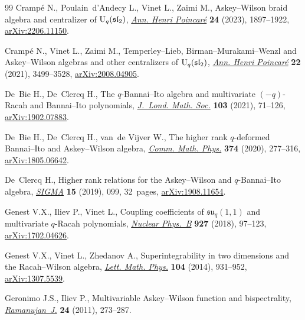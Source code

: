 \documentclass[pdftex]{sigma}
\numberwithin{equation}{section}
\theoremstyle{definition}
\begin{document}
\begin{thebibliography}{99}
Cramp\'e N., Poulain~d'Andecy L., Vinet L., Zaimi M., Askey--{W}ilson braid
 algebra and centralizer of {${\rm U}_q(\mathfrak{sl}_2)$}, \href{https://doi.org/10.1007/s00023-023-01275-4}{\textit{Ann. Henri
 Poincar\'e}} \textbf{24} (2023), 1897--1922, \href{https://arxiv.org/abs/2206.11150}{arXiv:2206.11150}.

Cramp\'e N., Vinet L., Zaimi M., Temperley--{L}ieb,
 {B}irman--{M}urakami--{W}enzl and {A}skey--{W}ilson algebras and other
 centralizers of {${\rm U}_q(\mathfrak{sl}_2)$}, \href{https://doi.org/10.1007/s00023-021-01064-x}{\textit{Ann. Henri Poincar\'e}}
 \textbf{22} (2021), 3499--3528, \href{https://arxiv.org/abs/2008.04905}{arXiv:2008.04905}.

De~Bie H., De~Clercq H., The {$q$}-{B}annai--{I}to algebra and multivariate
 {$(-q)$}-{R}acah and {B}annai--{I}to polynomials, \href{https://doi.org/10.1112/jlms.12367}{\textit{J.~Lond. Math.
 Soc.}} \textbf{103} (2021), 71--126, \href{https://arxiv.org/abs/1902.07883}{arXiv:1902.07883}.

De~Bie H., De~Clercq H., van~de Vijver W., The higher rank {$q$}-deformed
 {B}annai--{I}to and {A}skey--{W}ilson algebra, \href{https://doi.org/10.1007/s00220-019-03562-w}{\textit{Comm. Math. Phys.}}
 \textbf{374} (2020), 277--316, \href{https://arxiv.org/abs/1805.06642}{arXiv:1805.06642}.

De~Clercq H., Higher rank relations for the {A}skey--{W}ilson and
 {$q$}-{B}annai--{I}to algebra, \href{https://doi.org/10.3842/SIGMA.2019.099}{\textit{SIGMA}} \textbf{15} (2019), 099,
 32~pages, \href{https://arxiv.org/abs/1908.11654}{arXiv:1908.11654}.

Genest V.X., Iliev P., Vinet L., Coupling coefficients of
 {$\mathfrak{su}_q(1,1)$} and multivariate {$q$}-{R}acah polynomials,
 \href{https://doi.org/10.1016/j.nuclphysb.2017.12.009}{\textit{Nuclear Phys.~B}} \textbf{927} (2018), 97--123, \href{https://arxiv.org/abs/1702.04626}{arXiv:1702.04626}.

Genest V.X., Vinet L., Zhedanov A., Superintegrability in two dimensions and
 the {R}acah--{W}ilson algebra, \href{https://doi.org/10.1007/s11005-014-0697-y}{\textit{Lett. Math. Phys.}} \textbf{104}
 (2014), 931--952, \href{https://arxiv.org/abs/1307.5539}{arXiv:1307.5539}.

Geronimo J.S., Iliev P., Multivariable {A}skey--{W}ilson function and
 bispectrality, \href{https://doi.org/10.1007/s11139-010-9244-3}{\textit{Ramanujan~J.}} \textbf{24} (2011), 273--287.


\end{thebibliography}
\end{document}
